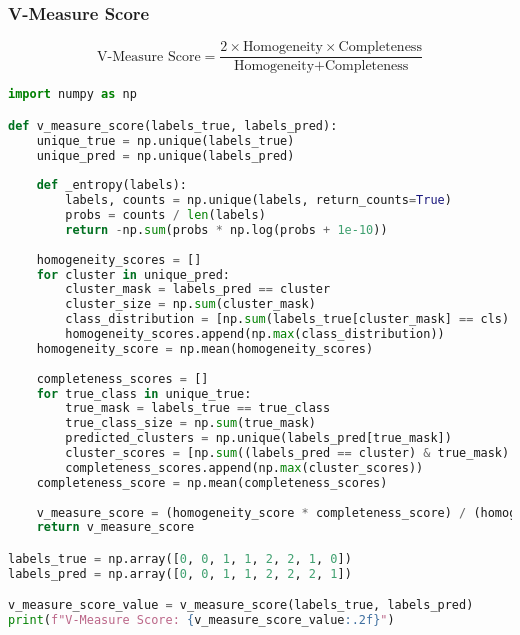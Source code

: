 \newpage

\subsubsection{V-Measure Score}

\[\text{V-Measure Score} = \frac{2 \times \text{Homogeneity} \times \text{Completeness}}{\text{Homogeneity} + \text{Completeness}}\]

\begin{lstlisting}[language=Python]
import numpy as np

def v_measure_score(labels_true, labels_pred):
    unique_true = np.unique(labels_true)
    unique_pred = np.unique(labels_pred)
    
    def _entropy(labels):
        labels, counts = np.unique(labels, return_counts=True)
        probs = counts / len(labels)
        return -np.sum(probs * np.log(probs + 1e-10))
    
    homogeneity_scores = []
    for cluster in unique_pred:
        cluster_mask = labels_pred == cluster
        cluster_size = np.sum(cluster_mask)
        class_distribution = [np.sum(labels_true[cluster_mask] == cls) / cluster_size for cls in unique_true]
        homogeneity_scores.append(np.max(class_distribution))
    homogeneity_score = np.mean(homogeneity_scores)
    
    completeness_scores = []
    for true_class in unique_true:
        true_mask = labels_true == true_class
        true_class_size = np.sum(true_mask)
        predicted_clusters = np.unique(labels_pred[true_mask])
        cluster_scores = [np.sum((labels_pred == cluster) & true_mask) / true_class_size for cluster in predicted_clusters]
        completeness_scores.append(np.max(cluster_scores))
    completeness_score = np.mean(completeness_scores)
    
    v_measure_score = (homogeneity_score * completeness_score) / (homogeneity_score + completeness_score)
    return v_measure_score

labels_true = np.array([0, 0, 1, 1, 2, 2, 1, 0])
labels_pred = np.array([0, 0, 1, 1, 2, 2, 2, 1])

v_measure_score_value = v_measure_score(labels_true, labels_pred)
print(f"V-Measure Score: {v_measure_score_value:.2f}")
\end{lstlisting}

\newpage